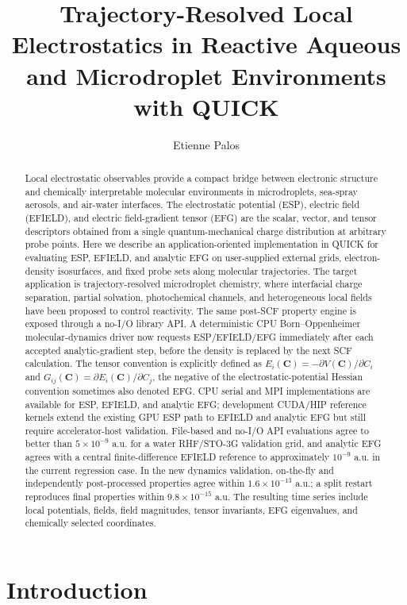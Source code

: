 \documentclass[journal=jctcce,manuscript=article,email=false]{achemso}
\title{Trajectory-Resolved Local Electrostatics in Reactive Aqueous and Microdroplet Environments with QUICK}
\author{Etienne Palos}
\affiliation{Department of Chemistry, Michigan State University, East Lansing, Michigan, United States}
\newcommand{\quick}{QUICK}
\begin{document}
\begin{abstract}
Local electrostatic observables provide a compact bridge between electronic
structure and chemically interpretable molecular environments in
microdroplets, sea-spray aerosols, and air-water interfaces.  The
electrostatic potential (ESP), electric field (EFIELD), and electric
field-gradient tensor (EFG) are the scalar, vector, and tensor descriptors
obtained from a single quantum-mechanical charge distribution at arbitrary
probe points.  Here we describe an application-oriented implementation in
\quick{} for evaluating ESP, EFIELD, and analytic EFG on user-supplied
external grids, electron-density isosurfaces, and fixed probe sets along
molecular trajectories.  The target application is trajectory-resolved
microdroplet chemistry, where interfacial charge separation, partial
solvation, photochemical channels, and heterogeneous local fields have
been proposed to control reactivity.  The same post-SCF property engine is
exposed through a no-I/O library API.  A deterministic CPU
Born--Oppenheimer molecular-dynamics driver now requests ESP/EFIELD/EFG
immediately after each accepted analytic-gradient step, before the density
is replaced by the next SCF calculation.  The tensor convention is
explicitly defined as
\(E_i(\mathbf{C})=-\partial V(\mathbf{C})/\partial C_i\) and
\(G_{ij}(\mathbf{C})=\partial E_i(\mathbf{C})/\partial C_j\), the negative
of the electrostatic-potential Hessian convention sometimes also denoted
EFG.  CPU serial and MPI implementations are available for ESP, EFIELD,
and analytic EFG; development CUDA/HIP reference kernels extend the
existing GPU ESP path to EFIELD and analytic EFG but still require
accelerator-host validation.  File-based and no-I/O API
evaluations agree to better than \(5\times10^{-9}\) a.u. for a water
RHF/STO-3G validation grid, and analytic EFG agrees with a central
finite-difference EFIELD reference to approximately \(10^{-9}\) a.u. in
the current regression case.  In the new dynamics validation, on-the-fly
and independently post-processed properties agree within
\(1.6\times10^{-13}\) a.u.; a split restart reproduces final properties
within \(9.8\times10^{-15}\) a.u.  The resulting time series include local
potentials, fields, field magnitudes, tensor invariants, EFG eigenvalues,
and chemically selected coordinates.
\end{abstract}

\section{Introduction}
\end{document}
